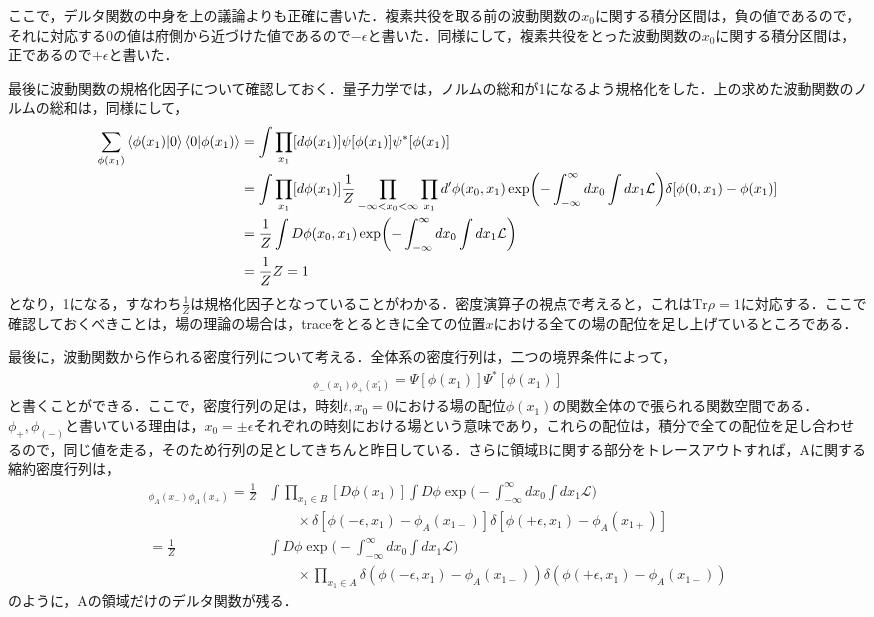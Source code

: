 ここで，デルタ関数の中身を上の議論よりも正確に書いた．複素共役を取る前の波動関数の$x_0$に関する積分区間は，負の値であるので，それに対応する$0$の値は府側から近づけた値であるので$-\epsilon$と書いた．同様にして，複素共役をとった波動関数の$x_0$に関する積分区間は，正であるので$+\epsilon$と書いた．

最後に波動関数の規格化因子について確認しておく．量子力学では，ノルムの総和が1になるよう規格化をした．上の求めた波動関数のノルムの総和は，同様にして，
\begin{align}
  \sum_{\phi(x_1)}\braket{\phi(x_1)|0}\braket{0|\phi(x_1)}&=\int\prod_{x_1}[d\phi(x_1)]\psi[\phi(x_{1})]\psi^{*}[\phi(x_{1})] \\
  &=\int\prod_{x_1}[d\phi(x_1)]\frac{1}{Z}\prod_{-\infty<x_0<\infty}\prod_{x_1}d^{\prime}\phi(x_0,x_1) \exp\biggl(-\int^{\infty}_{-\infty}dx_0\int dx_1\mathcal{L}\biggr)\delta[\phi(0,x_1)-\phi(x_1)]\\
  &=\frac{1}{Z}\int D\phi(x_0,x_1) \exp\biggl(-\int^{\infty}_{-\infty}dx_0\int dx_1\mathcal{L}\biggr)\\
  &=\frac{1}{Z}Z=1
\end{align}
となり，1になる，すなわち$\frac{1}{Z}$は規格化因子となっていることがわかる．密度演算子の視点で考えると，これは$\mathrm{Tr}\rho=1$に対応する．ここで確認しておくべきことは，場の理論の場合は，traceをとるときに全ての位置$x$における全ての場の配位を足し上げているところである．

最後に，波動関数から作られる密度行列について考える．全体系の密度行列は，二つの境界条件によって，
\begin{align}
  [\rho_{tot}]_{\phi_{-}(x_1)\phi_{+}(x_1^{\prime})}=\Psi[\phi(x_1)]\Psi^{*}[\phi(x_1)]
\end{align}
と書くことができる．ここで，密度行列の足は，時刻$t,x_0=0$における場の配位$\phi(x_1)$の関数全体ので張られる関数空間である．$\phi_{+},\phi_(-)$と書いている理由は，$x_0=\pm\epsilon$それぞれの時刻における場という意味であり，これらの配位は，積分で全ての配位を足し合わせるので，同じ値を走る，そのため行列の足としてきちんと昨日している．さらに領域Bに関する部分をトレースアウトすれば，Aに関する縮約密度行列は，
\begin{align}
  [\rho_{A}]_{\phi_A(x_-)\phi_A(x_+)}=\frac{1}{Z}&\int\prod_{x_1 \in B}[D\phi(x_1)]\int D\phi \exp\biggl(-\int_{-\infty}^{\infty}dx_0\int dx_1\mathcal{L}\biggr)\nonumber \\
  &\qquad \times\delta[\phi(-\epsilon,x_1)-\phi_{A}(x_{1-})]\delta[\phi(+\epsilon,x_1)-\phi_{A}(x_{1+})] \\
  =\frac{1}{Z}&\int D\phi \exp\biggl(-\int_{-\infty}^{\infty}dx_0\int dx_1\mathcal{L}\biggr)\\
  &\qquad
  \times\prod_{x_1\in A}\delta(\phi(-\epsilon,x_1)-\phi_{A}(x_{1-}))\delta(\phi(+\epsilon,x_1)-\phi_{A}(x_{1-}))
\end{align}
のように，Aの領域だけのデルタ関数が残る．
